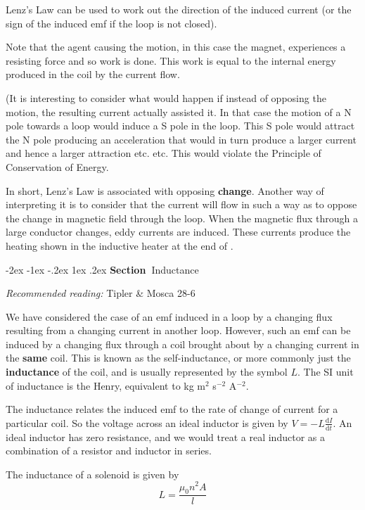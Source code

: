 \documentclass[
]{book}
\makeatletter
\renewcommand\section{%
\@startsection{section}{1}{\z@}%
              {-2ex \@plus -1ex \@minus -.2ex}%
              {1ex \@plus .2ex}%
              {\sffamily\bfseries\large\noindent Section~}}
\numberwithin{equation}{section}
\makeatother
\begin{document}
Lenz's Law can be used to work out the direction of the induced current
(or the sign of the induced emf if the loop is not closed).

Note that the agent causing the motion, in this case the magnet,
experiences a resisting force and so work is done. This work is equal to
the internal energy produced in the coil by the current flow.

(It is interesting to consider what would happen if instead of opposing
the motion, the resulting current actually assisted it. In that case the
motion of a N pole towards a loop would induce a S pole in the loop.
This S pole would attract the N pole producing an acceleration that
would in turn produce a larger current and hence a larger attraction
etc. etc. This would violate the Principle of Conservation of Energy.

In short, Lenz's Law is associated with opposing \textbf{change}. Another way
of interpreting it is to consider that the current will flow in such a
way as to oppose the change in magnetic field through the loop. When the
magnetic flux through a large conductor changes, eddy currents are
induced. These currents produce the heating shown in the inductive
heater at the end of .

\hypertarget{inductance}{%
\section{Inductance}\label{inductance}}

\emph{Recommended reading:} Tipler \& Mosca 28-6

We have considered the case of an emf induced in a loop by a changing
flux resulting from a changing current in another loop. However, such an
emf can be induced by a changing flux through a coil brought about by a
changing current in the \textbf{same} coil. This is known as the
self-inductance, or more commonly just the \textbf{inductance} of the coil,
and is usually represented by the symbol \(L\). The SI unit of inductance
is the Henry, equivalent to kg m\(^2\) s\(^{-2}\) A\(^{-2}\).

The inductance relates the induced emf to the rate of change of current
for a particular coil. So the voltage across an ideal inductor is given
by \(V = -L \frac{\mathrm{d} I}{\mathrm{d} t}\). An ideal inductor has zero resistance,
and we would treat a real inductor as a combination of a resistor and
inductor in series.

The inductance of a solenoid is given by \[L = \frac{\mu_0 n^2 A}{l}\]
\end{document}

